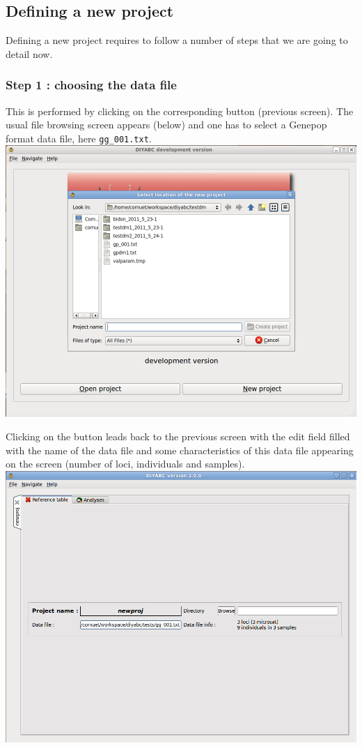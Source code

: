 \subsection{Defining a new project}
Defining a new project requires to follow a number of steps that we are going to detail now.

\subsubsection{Step 1 : choosing the data file}
This is performed by clicking on the corresponding  button (previous screen).  The usual file browsing screen appears (below) and one has to select a Genepop format data file, here \texttt{gg\_001.txt}. \\

\includegraphics[scale=0.35]{gui_pictures/Capture-DIYABC-7.png} 

Clicking on the  button leads back to the previous screen with the edit field filled with the name of the data file and some characteristics of this data file appearing on the screen (number of loci, individuals and samples).\\

\includegraphics[scale=0.35]{gui_pictures/Capture-DIYABC-8.png} 

